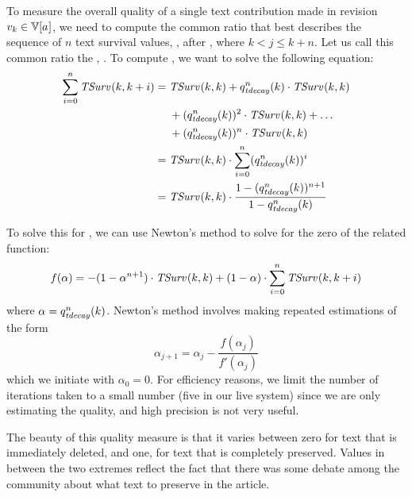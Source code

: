 To measure the overall quality of a single text contribution
made in revision $\version{k} \in \versions{\article{}}$, we need to compute the common ratio
that best describes the sequence of $n$ text survival values,
, after , where $k < j \le k+n$.
Let us call this common ratio the ,
.
To compute , we want to solve the following equation:
\begin{align*}
    \sum_{i=0}^n \tsurv{}{k,k+i} = {} & \tsurv{}{k,k} + \quality{tdecay}{n}{k} \cdot \tsurv{}{k,k} \\
    & + (\quality{tdecay}{n}{k})^2 \cdot \tsurv{}{k,k} + \ldots \\
    & + (\quality{tdecay}{n}{k})^n \cdot \tsurv{}{k,k} \\
    = {} & \tsurv{}{k,k} \cdot \sum_{i=0}^n (\quality{tdecay}{n}{k})^i \\
    = {} & \tsurv{}{k,k} \cdot \frac{1 - (\quality{tdecay}{n}{k})^{n+1}}{1 - \quality{tdecay}{n}{k}} \\
\end{align*}

To solve this for , we can use Newton's method
to solve for the zero of the related function:
\begin{equation}
  f(\alpha) =
        - (1 - \alpha^{n+1}) \cdot \tsurv{}{k,k}
        + (1 - \alpha) \cdot \sum_{i=0}^n \tsurv{}{k,k+i}
\label{eq:soln-tdecay}
\end{equation}
where $\alpha = \quality{tdecay}{n}{k}$.
Newton's method involves making repeated estimations of the form
\begin{equation*}
  \alpha_{j+1} = \alpha_j - \frac{f(\alpha_j)}{f'(\alpha_j)}
\end{equation*}
which we initiate with $\alpha_0 = 0$.
For efficiency reasons, we limit the number of iterations taken
to a small number (five in our live system)
since we are only estimating the quality, and high precision
is not very useful.

The beauty of this quality measure is that it varies between
zero for text that is immediately deleted, and one, for text
that is completely preserved.
Values in between the two extremes reflect the fact that there
was some debate among the community about what text to preserve
in the article.

